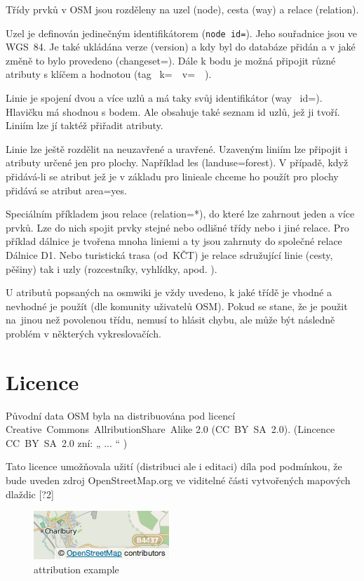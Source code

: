 Třídy prvků v OSM jsou rozděleny na uzel (node), cesta (way) a 
relace (relation).

Uzel je definován jedinečným identifikátorem ({\tt node id=}). Jeho 
souřadnice jsou ve WGS~­84. Je také ukládána verze (version) a kdy 
byl do databáze přidán a v jaké změně to bylo provedeno (changeset=). 
Dále k bodu je možná připojit různé atributy s klíčem a hodnotou (tag~
k=~~v=~~). 

Linie je spojení dvou a více uzlů a má taky svůj identifikátor (way~
id=). Hlavičku má shodnou s bodem. Ale obsahuje také seznam id uzlů, 
jež ji tvoří. Liniím lze jí taktéž přiřadit atributy.  

Linie lze ještě rozdělit na neuzavřené a uravřené. Uzaveným liniím lze připojit 
i atributy určené jen pro plochy. Například les (landuse=forest).
V případě, když přidává-li se atribut jež je v základu pro linieale chceme ho použít pro plochy přidává se atribut area=yes.

Speciálním příkladem jsou relace (relation=*), do které lze zahrnout 
jeden a více prvků. Lze do nich spojit prvky stejné nebo odlišné třídy 
nebo i jiné relace. Pro příklad dálnice je tvořena mnoha liniemi a ty 
jsou zahrnuty do společné relace Dálnice D1. Nebo turistická trasa 
(od~KČT) je relace sdružující linie (cesty, pěšiny) tak i uzly 
(rozcestníky, vyhlídky, apod. ).

U atributů popsaných na osmwiki je vždy uvedeno, k jaké třídě je 
vhodné a nevhodné je použít (dle komunity uživatelů OSM). Pokud se stane, že je použit 
na~jinou než povolenou třídu, nemusí to hlásit chybu, ale může být následně 
problém v některých vykreslovačích. 

\section{Licence}
\label{licence}

Původní data OSM byla na distribuována pod licencí 
Creative~Commons~Allribution­Share~Alike 2.0 (CC~BY~­SA~2.0). 
(Lincence CC~BY~SA~2.0 zní:  „ ... “  )

Tato licence umožňovala užití (distribuci ale i editaci) díla pod podmínkou, 
že bude uveden zdroj OpenStreetMap.org ve viditelné části 
vytvořených mapových dlaždic [?2] 

  \begin{figure}[hbt]
    \centering
      \includegraphics{./pictures/attribution_example.png}
      \caption{attribution example}
      \label{fig:attribution_example}
  \end{figure} 

